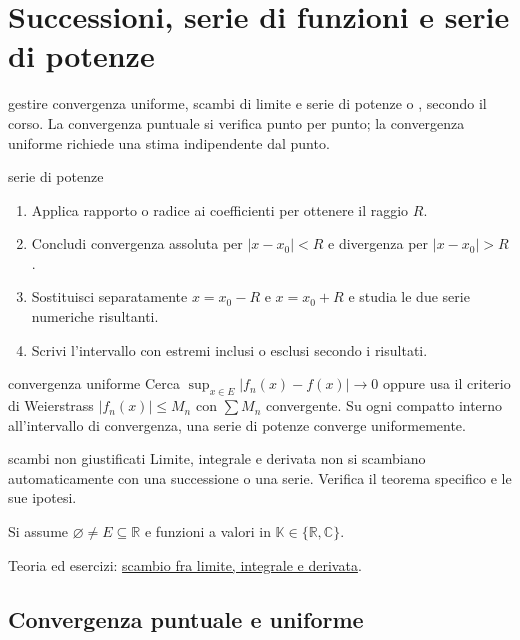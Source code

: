\chapter{Successioni, serie di funzioni e serie di potenze}
\label{chap:18}

\begin{obiettivocapitolo}{gestire convergenza uniforme, scambi di limite e serie di potenze}
\prioritamedia o \estensione, secondo il corso. La convergenza puntuale si verifica punto per punto; la convergenza uniforme richiede una stima indipendente dal punto.
\end{obiettivocapitolo}
\begin{proceduraesame}{serie di potenze}
\begin{enumerate}
\item Applica rapporto o radice ai coefficienti per ottenere il raggio $R$.
\item Concludi convergenza assoluta per $|x-x_0|<R$ e divergenza per $|x-x_0|>R$.
\item Sostituisci separatamente $x=x_0-R$ e $x=x_0+R$ e studia le due serie numeriche risultanti.
\item Scrivi l'intervallo con estremi inclusi o esclusi secondo i risultati.
\end{enumerate}
\end{proceduraesame}
\begin{sceltametodo}{convergenza uniforme}
Cerca $\sup_{x\in E}|f_n(x)-f(x)|\to0$ oppure usa il criterio di Weierstrass $|f_n(x)|\le M_n$ con $\sum M_n$ convergente. Su ogni compatto interno all'intervallo di convergenza, una serie di potenze converge uniformemente.
\end{sceltametodo}
\begin{errorefrequente}{scambi non giustificati}
Limite, integrale e derivata non si scambiano automaticamente con una successione o una serie. Verifica il teorema specifico e le sue ipotesi.
\end{errorefrequente}

Si assume \(\varnothing\ne E\subseteq\mathbb R\) e funzioni a valori in \(\mathbb K\in\{\mathbb R,\mathbb C\}\).

Teoria ed esercizi: \href{https://ingegnerismo.it/matematica/scambio-limite-integrale-derivata-esercizi/}{scambio fra limite, integrale e derivata}.

\section{Convergenza puntuale e uniforme}\label{convergenza-puntuale-e-uniforme}

